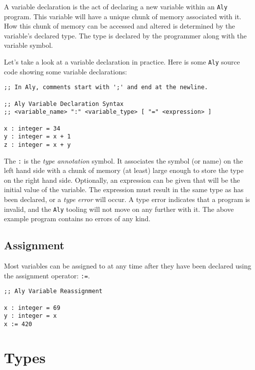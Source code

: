 \documentclass[12pt]{report}
\begin{document}
A variable declaration is the act of declaring a new variable within an \verb|Aly| program. This variable will have a unique chunk of memory associated with it. How this chunk of memory can be accessed and altered is determined by the variable's declared type. The type is declared by the programmer along with the variable symbol.

Let's take a look at a variable declaration in practice. Here is some \verb|Aly| source code showing some variable declarations:
\begin{Verbatim}[samepage=true]
;; In Aly, comments start with ';' and end at the newline.

;; Aly Variable Declaration Syntax
;; <variable_name> ":" <variable_type> [ "=" <expression> ]

x : integer = 34
y : integer = x + 1
z : integer = x + y
\end{Verbatim}

The \verb|:| is the \emph{type annotation} symbol. It associates the symbol (or name) on the left hand side with a chunk of memory (at least) large enough to store the type on the right hand side. Optionally, an expression can be given that will be the initial value of the variable. The expression must result in the same type as has been declared, or a \emph{type error} will occur. A type error indicates that a program is invalid, and the \verb|Aly| tooling will not move on any further with it. The above example program contains no errors of any kind.

\section*{Assignment}
\label{subsec:variables-assignment}

Most variables can be assigned to at any time after they have been declared using the assignment operator: \verb|:=|.
\begin{Verbatim}[samepage=true]
;; Aly Variable Reassignment

x : integer = 69
y : integer = x
x := 420
\end{Verbatim}

\chapter{Types}
\label{sec:types}
\end{document}
